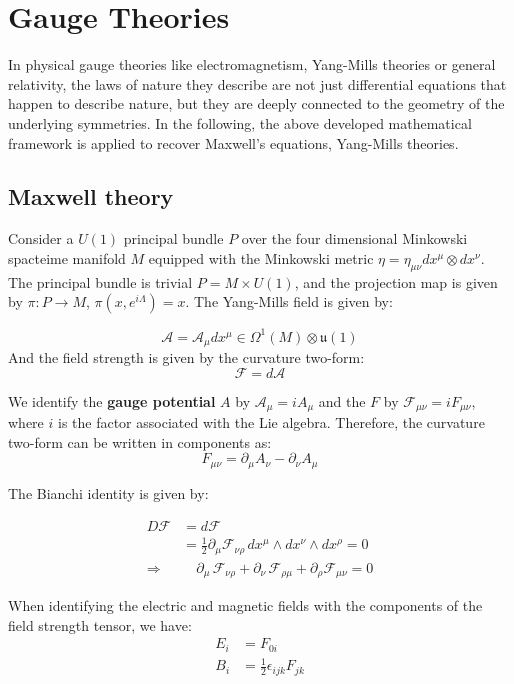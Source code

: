
\section{Gauge Theories}

In physical gauge theories like electromagnetism, Yang-Mills theories or general relativity, the laws of nature they describe are not just differential equations that happen to describe nature, but they are deeply connected to the geometry of the underlying symmetries. In the following, the above developed mathematical framework is applied to recover Maxwell's equations, Yang-Mills theories.

\subsection{Maxwell theory}

Consider a $U(1)$ principal bundle $P$ over the four dimensional Minkowski spacteime manifold $M$ equipped with the Minkowski metric $\eta = \eta_{\mu\nu}dx^\mu \otimes dx^\nu$. The principal bundle is trivial $P = M \times U(1)$, and the projection map is given by $\pi: P \to M$, $\pi(x,e^{i\Lambda}) = x$. The Yang-Mills field is given by:

\[ \mathcal{A}= \mathcal{A}_\mu dx^\mu \in \Omega^1(M)\otimes \mathfrak{u}(1) \]
And the field strength is given by the curvature two-form:
\[ \mathscr{F} = d \mathcal{A} \]

We identify the \textbf{gauge potential} $A$ by $\mathcal{A}_\mu=iA_\mu$ and the  $F$ by $\mathscr{F}_{\mu\nu} = iF_{\mu\nu}$, where $i$ is the factor associated with the Lie algebra. Therefore, the curvature two-form can be written in components as:
\[ F_{\mu\nu} = \partial_\mu A_\nu - \partial_\nu A_\mu \]

The Bianchi identity is given by:

\begin{align*}
  D\mathscr{F} &= d\mathscr{F} \\
  &= \frac12\partial_\mu \mathscr{F}_{\nu\rho} \, dx^\mu \wedge dx^\nu \wedge dx^\rho = 0 \\
  \Rightarrow & \quad \partial_\mu \, \mathscr{F}_{\nu\rho} + \partial_\nu \, \mathscr{F}_{\rho\mu} + \partial_\rho \mathscr{F}_{\mu\nu} = 0
\end{align*}


When identifying the electric and magnetic fields with the components of the field strength tensor, we have:
\begin{align*}
  E_i &= F_{0i}\\
  B_i &= \frac12 \epsilon_{ijk} F_{jk} 
\end{align*}

